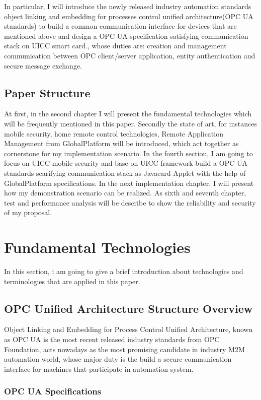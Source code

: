 \documentclass[]{llncs}
\begin{document}
In particular, I will introduce the newly released industry automation standards object linking and embedding for processes control unified architecture(OPC UA standards) to build a common communication interface for devices that are mentioned above and design a OPC UA specification satisfying communication stack on UICC smart card., whose duties are: creation and management communication between OPC client/server application, entity authentication and secure message exchange.

\subsection{Paper Structure}
At first, in the second chapter I will present the fundamental technologies which will be frequently mentioned in this paper. Secondly the state of art, for instances mobile security,  home remote control technologies, Remote Application Management from GlobalPlatform will be introduced, which act together as cornerstone for my implementation scenario. In the fourth section, I am going to focus on  UICC mobile security  and base on UICC framework build a  OPC UA standards scarifying communication stack  as Javacard Applet with the help of GlobalPlatform  specifications. In the next implementation chapter, I will present how my  demonstration scenario can be realized. As sixth and seventh chapter,  test and performance analysis will be describe to show the reliability and security of my proposal.
  
\section{Fundamental Technologies}
In this section, i am going to give a brief introduction about technologies and terminologies that are applied in this paper. 

\subsection{OPC Unified Architecture Structure Overview }
Object Linking and Embedding for Process Control Unified Architecture, known as OPC UA is the most recent released industry standards from OPC Foundation, acts nowadays as the most promising candidate in industry M2M automation world, whose major duty is the build a secure communication interface for machines that participate in automation system. 

\subsubsection{OPC UA Specifications}
\end{document}
